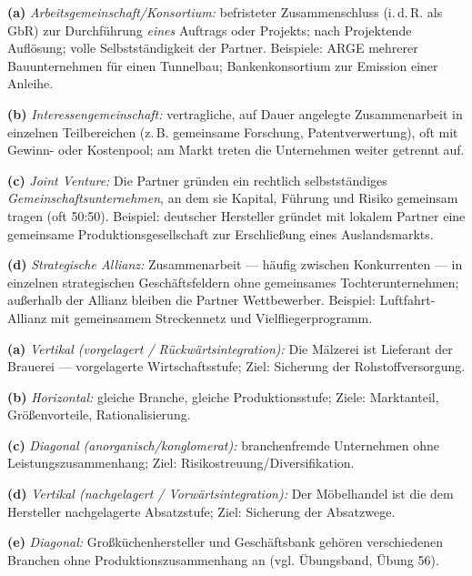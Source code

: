 \documentclass[11pt, a4paper]{article}
\begin{document}
\begin{loesung}[title={Lösung Aufgabe~3 --- Formen der Kooperation}]
\textbf{(a)} \emph{Arbeitsgemeinschaft/Konsortium:} befristeter Zusammenschluss
(i.\,d.\,R. als GbR) zur Durchführung \emph{eines} Auftrags oder Projekts; nach
Projektende Auflösung; volle Selbstständigkeit der Partner. Beispiele: ARGE mehrerer
Bauunternehmen für einen Tunnelbau; Bankenkonsortium zur Emission einer Anleihe.

\textbf{(b)} \emph{Interessengemeinschaft:} vertragliche, auf Dauer angelegte
Zusammenarbeit in einzelnen Teilbereichen (z.\,B. gemeinsame Forschung, Patentverwertung),
oft mit Gewinn- oder Kostenpool; am Markt treten die Unternehmen weiter getrennt auf.

\textbf{(c)} \emph{Joint Venture:} Die Partner gründen ein rechtlich selbstständiges
\emph{Gemeinschaftsunternehmen}, an dem sie Kapital, Führung und Risiko gemeinsam tragen
(oft 50:50). Beispiel: deutscher Hersteller gründet mit lokalem Partner eine gemeinsame
Produktionsgesellschaft zur Erschließung eines Auslandsmarkts.

\textbf{(d)} \emph{Strategische Allianz:} Zusammenarbeit --- häufig zwischen
Konkurrenten --- in einzelnen strategischen Geschäftsfeldern ohne gemeinsames
Tochterunternehmen; außerhalb der Allianz bleiben die Partner Wettbewerber. Beispiel:
Luftfahrt-Allianz mit gemeinsamem Streckennetz und Vielfliegerprogramm.
\end{loesung}

\begin{loesung}[title={Lösung Aufgabe~4 --- horizontal, vertikal, diagonal}]
\textbf{(a)} \emph{Vertikal (vorgelagert / Rückwärtsintegration):} Die Mälzerei ist
Lieferant der Brauerei --- vorgelagerte Wirtschaftsstufe; Ziel: Sicherung der
Rohstoffversorgung.

\textbf{(b)} \emph{Horizontal:} gleiche Branche, gleiche Produktionsstufe; Ziele:
Marktanteil, Größenvorteile, Rationalisierung.

\textbf{(c)} \emph{Diagonal (anorganisch/konglomerat):} branchenfremde Unternehmen ohne
Leistungszusammenhang; Ziel: Risikostreuung/Diversifikation.

\textbf{(d)} \emph{Vertikal (nachgelagert / Vorwärtsintegration):} Der Möbelhandel ist
die dem Hersteller nachgelagerte Absatzstufe; Ziel: Sicherung der Absatzwege.

\textbf{(e)} \emph{Diagonal:} Großküchenhersteller und Geschäftsbank gehören
verschiedenen Branchen ohne Produktionszusammenhang an (vgl. Übungsband, Übung 56).
\end{loesung}
\end{document}
